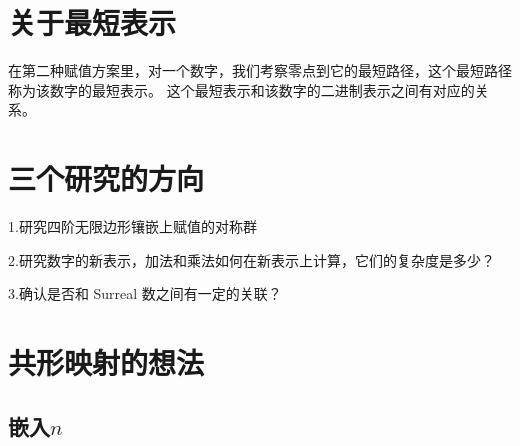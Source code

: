 \documentclass[a4paper,12pt]{article}
\begin{document}
\section{关于最短表示}

在第二种赋值方案里，对一个数字，我们考察零点到它的最短路径，这个最短路径称为该数字的最短表示。
这个最短表示和该数字的二进制表示之间有对应的关系。

\section{三个研究的方向}

1.研究四阶无限边形镶嵌上赋值的对称群

2.研究数字的新表示，加法和乘法如何在新表示上计算，它们的复杂度是多少？

3.确认是否和 Surreal 数之间有一定的关联？

\newpage

\section{共形映射的想法}

\subsection{嵌入$n$}
\end{document}
